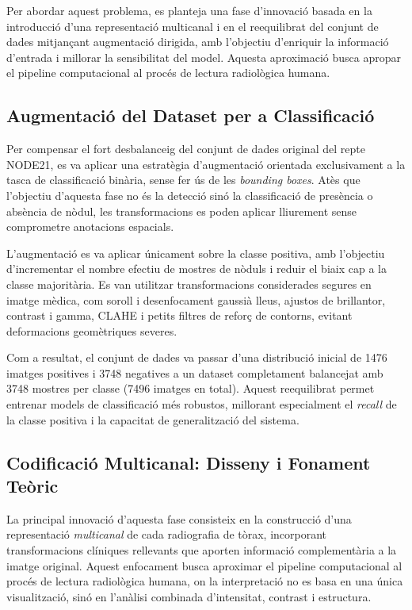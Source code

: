 \documentclass[conference]{IEEEtran}
\begin{document}
Per abordar aquest problema, es planteja una fase d’innovació basada en la introducció
d’una representació multicanal i en el reequilibrat del conjunt de dades mitjançant
augmentació dirigida, amb l’objectiu d’enriquir la informació d’entrada i millorar la
sensibilitat del model. Aquesta aproximació busca apropar el pipeline computacional al
procés de lectura radiològica humana.


\subsection{Augmentació del Dataset per a Classificació}

Per compensar el fort desbalanceig del conjunt de dades original del repte NODE21,
es va aplicar una estratègia d’augmentació orientada exclusivament a la tasca de
classificació binària, sense fer ús de les \textit{bounding boxes}. Atès que l’objectiu
d’aquesta fase no és la detecció sinó la classificació de presència o absència de nòdul,
les transformacions es poden aplicar lliurement sense comprometre anotacions espacials.

L’augmentació es va aplicar únicament sobre la classe positiva, amb l’objectiu
d’incrementar el nombre efectiu de mostres de nòduls i reduir el biaix cap a la classe
majoritària. Es van utilitzar transformacions considerades segures en imatge mèdica,
com soroll i desenfocament gaussià lleus, ajustos de brillantor, contrast i gamma,
CLAHE i petits filtres de reforç de contorns, evitant deformacions geomètriques severes.

Com a resultat, el conjunt de dades va passar d’una distribució inicial de 1476 imatges
positives i 3748 negatives a un dataset completament balancejat amb 3748 mostres per
classe (7496 imatges en total). Aquest reequilibrat permet entrenar models de
classificació més robustos, millorant especialment el \textit{recall} de la classe positiva
i la capacitat de generalització del sistema.


\subsection{Codificació Multicanal: Disseny i Fonament Teòric}

La principal innovació d’aquesta fase consisteix en la construcció d’una representació
\textit{multicanal} de cada radiografia de tòrax, incorporant transformacions clíniques
rellevants que aporten informació complementària a la imatge original. Aquest enfocament
busca aproximar el pipeline computacional al procés de lectura radiològica humana,
on la interpretació no es basa en una única visualització, sinó en l’anàlisi combinada
d’intensitat, contrast i estructura.
\end{document}
